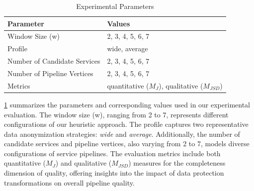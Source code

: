       \begin{table}[h!]
        \caption{Experimental Parameters}
        \label{tab:parameters}
        \centering
        {\color{OurColor2}
          \begin{tabular}{l|l}
            \textbf{Parameter}                  & \textbf{Values}  \\
            \hline
            Window Size (\textbar{}w\textbar{}) & 2, 3, 4, 5, 6, 7 \\
            Profile                             & wide, average    \\
            Number of Candidate Services        & 2, 3, 4, 5, 6, 7 \\
            Number of Pipeline Vertices            & 2, 3, 4, 5, 6, 7 \\
            Metrics                             & quantitative ($M_J$), qualitative ($M_{JSD}$) \\
          \end{tabular}
        }
      \end{table}
    {\color{OurColor2}
    \cref{tab:parameters} summarizes the parameters and corresponding values used in our experimental evaluation. The window size (\textbar{}w\textbar{}), ranging from 2 to 7, represents different configurations of our heuristic approach. The profile captures two representative data anonymization strategies: \textit{wide} and \textit{average}. Additionally, the number of candidate services and pipeline vertices, also varying from 2 to 7, models diverse configurations of service pipelines. The evaluation metrics include both quantitative ($M_J$) and qualitative ($M_{JSD}$) measures for the completeness dimension of quality, offering insights into the impact of data protection transformations on overall pipeline quality.
    }
